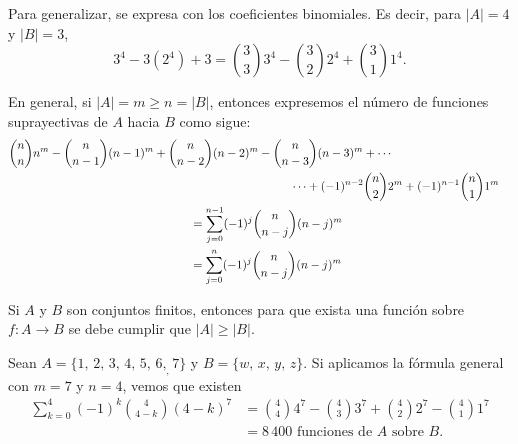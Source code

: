 \newpage

\begin{BOX}
    Para generalizar, se expresa con los coeficientes binomiales. Es decir, para $|A| = 4$ y $|B| = 3$,
    $$3^4 - 3 (2^4) + 3 = \binom{3}{3} 3^4 - \binom{3}{2} 2^4 + \binom{3}{1} 1^4.$$
\end{BOX}

\begin{BOX}
    En general, si $|A| = m \geq n = |B|$, entonces expresemos el número de funciones suprayectivas de $A$ hacia $B$ como sigue:\label{JEDHFHDJKHJFHGJGB}
    \begin{align*}
        \binom{n}{n} n^m - \binom{n}{n-1} (n-1)^m + \binom{n}{n-2}(n-2)^m - \binom{n}{n-3} (n-3)^m + \cdots \\
        & \hspace{-3cm} \cdots + (-1)^{n-2} \binom{n}{2} 2^m + (-1)^{n-1} \binom{n}{1} 1^m \\
        & \hspace{-6cm} = \sum_{j=0}^{n-1} (-1)^j \binom{n}{n-j} (n-j)^m \\
        & \hspace{-6cm} = \sum_{j=0}^{n} (-1)^j \binom{n}{n-j} (n-j)^m
    \end{align*}
\end{BOX}

\begin{importante}
    Si $A$ y $B$ son conjuntos finitos, entonces para que exista una función sobre $f:A \longrightarrow B$ se debe cumplir que $|A| \geq |B|$.
\end{importante}

\begin{myexample}\label{JAJSJJSJJDJUHBJDJ}
    Sean $A = \{1, \, 2, \, 3, \, 4, \, 5, \, 6, _, 7\}$ y $B = \{w, \, x, \, y, \, z\}$. Si aplicamos la fórmula general con $m = 7$ y $n = 4$, vemos que existen
    \begin{align*}
        \sum_{k=0}^4 (-1)^k \binom{4}{4-k} (4-k)^7 & = \binom{4}{4} 4^7 - \binom{4}{3} 3^7 + \binom{4}{2} 2^7 - \binom{4}{1} 1^7 \\
        & = 8 \, 400 \text{ funciones de $A$ sobre $B$.}
    \end{align*}
\end{myexample}

